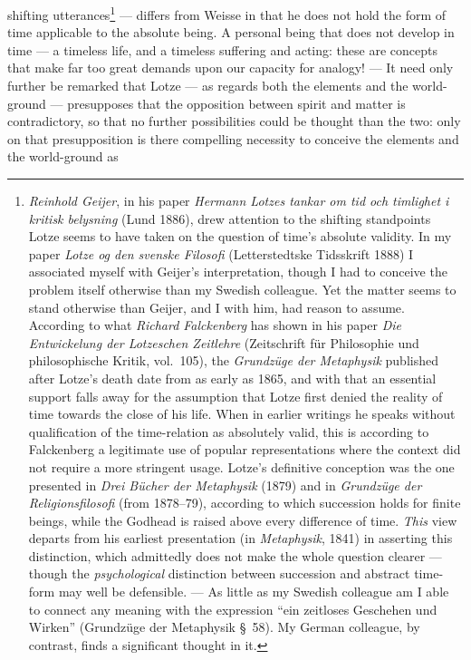 \documentclass[12pt,a4paper]{book}
\begin{document}
shifting utterances\footnote{\emph{Reinhold Geijer}, in his paper \textit{Hermann Lotzes
tankar om tid och timlighet i kritisk belysning} (Lund 1886), drew attention to
the shifting standpoints Lotze seems to have taken on the question of time's
absolute validity. In my paper \textit{Lotze og den svenske Filosofi}
(Letterstedtske Tidsskrift 1888) I associated myself with Geijer's
interpretation, though I had to conceive the problem itself otherwise than my
Swedish colleague. Yet the matter seems to stand otherwise than Geijer, and I
with him, had reason to assume. According to what \emph{Richard Falckenberg} has shown
in his paper \textit{Die Entwickelung der Lotzeschen Zeitlehre} (Zeitschrift für
Philosophie und philosophische Kritik, vol.~105), the \textit{Grundzüge der
Metaphysik} published after Lotze's death date from as early as 1865, and with
that an essential support falls away for the assumption that Lotze first denied
the reality of time towards the close of his life. When in earlier writings he
speaks without qualification of the time-relation as absolutely valid, this is
according to Falckenberg a legitimate use of popular representations where the
context did not require a more stringent usage. Lotze's definitive conception was
the one presented in \textit{Drei Bücher der Metaphysik} (1879) and in
\textit{Grundzüge der Religionsfilosofi} (from 1878--79), according to which
succession holds for finite beings, while the Godhead is raised above every
difference of time. \emph{This} view departs from his earliest presentation (in
\textit{Metaphysik}, 1841) in asserting this distinction, which admittedly does
not make the whole question clearer --- though the \emph{psychological}
distinction between succession and abstract time-form may well be defensible.
--- As little as my Swedish colleague am I able to connect any meaning with the
expression ``ein zeitloses Geschehen und Wirken'' (Grundzüge der Metaphysik
§~58). My German colleague, by contrast, finds a significant thought in it.} ---
differs from Weisse in that he does not hold the form of time applicable to the
absolute being. A personal being that does not develop in time --- a timeless
life, and a timeless suffering and acting: these are concepts that make far too
great demands upon our capacity for analogy! --- It need only further be remarked
that Lotze --- as regards both the elements and the world-ground --- presupposes
that the opposition between spirit and matter is contradictory, so that no
further possibilities could be thought than the two: only on that presupposition
is there compelling necessity to conceive the elements and the world-ground as
\end{document}
